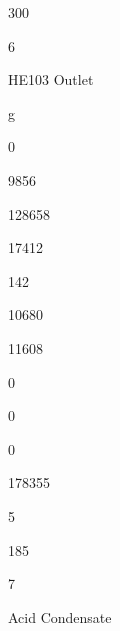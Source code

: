 \documentclass[a4paper,portrait,12pt]{article}
\begin{document}
300





6





\begin{flushleft}
HE103 Outlet
\end{flushleft}





\begin{flushleft}
g
\end{flushleft}





0





9856





128658





17412





142





10680





11608





0





0





0





178355





5





185





7





\begin{flushleft}
Acid Condensate
\end{flushleft}
\end{document}
